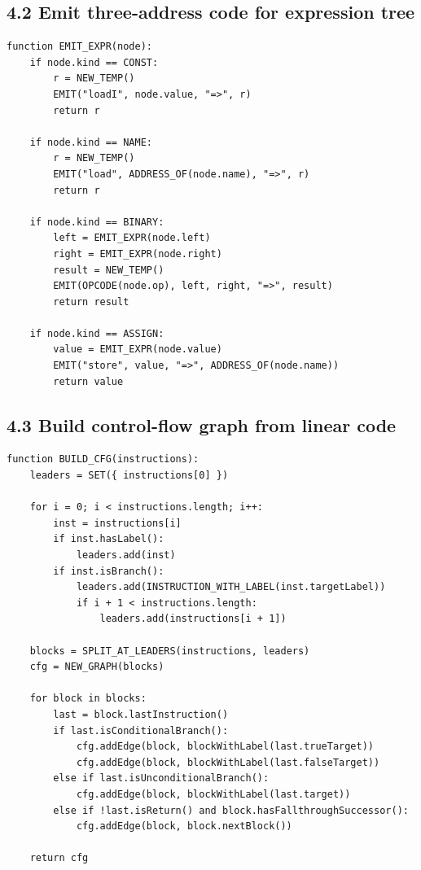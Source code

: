 \documentclass[10pt,letterpaper]{article}
\begin{document}
\subsection*{4.2 Emit three-address code for expression tree}

\begin{verbatim}
function EMIT_EXPR(node):
    if node.kind == CONST:
        r = NEW_TEMP()
        EMIT("loadI", node.value, "=>", r)
        return r

    if node.kind == NAME:
        r = NEW_TEMP()
        EMIT("load", ADDRESS_OF(node.name), "=>", r)
        return r

    if node.kind == BINARY:
        left = EMIT_EXPR(node.left)
        right = EMIT_EXPR(node.right)
        result = NEW_TEMP()
        EMIT(OPCODE(node.op), left, right, "=>", result)
        return result

    if node.kind == ASSIGN:
        value = EMIT_EXPR(node.value)
        EMIT("store", value, "=>", ADDRESS_OF(node.name))
        return value
\end{verbatim}

\subsection*{4.3 Build control-flow graph from linear code}

\begin{verbatim}
function BUILD_CFG(instructions):
    leaders = SET({ instructions[0] })

    for i = 0; i < instructions.length; i++:
        inst = instructions[i]
        if inst.hasLabel():
            leaders.add(inst)
        if inst.isBranch():
            leaders.add(INSTRUCTION_WITH_LABEL(inst.targetLabel))
            if i + 1 < instructions.length:
                leaders.add(instructions[i + 1])

    blocks = SPLIT_AT_LEADERS(instructions, leaders)
    cfg = NEW_GRAPH(blocks)

    for block in blocks:
        last = block.lastInstruction()
        if last.isConditionalBranch():
            cfg.addEdge(block, blockWithLabel(last.trueTarget))
            cfg.addEdge(block, blockWithLabel(last.falseTarget))
        else if last.isUnconditionalBranch():
            cfg.addEdge(block, blockWithLabel(last.target))
        else if !last.isReturn() and block.hasFallthroughSuccessor():
            cfg.addEdge(block, block.nextBlock())

    return cfg
\end{verbatim}
\end{document}
